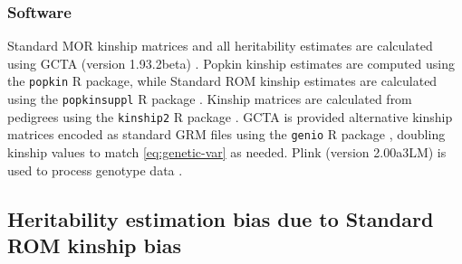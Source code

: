 \documentclass[11pt]{article}
\begin{document}
\subsubsection{Software}

Standard MOR kinship matrices and all heritability estimates are calculated using GCTA (version 1.93.2beta) \citep{yang_gcta:_2011}.
Popkin kinship estimates are computed using the \texttt{popkin} R package, while Standard ROM kinship estimates are calculated using the \texttt{popkinsuppl} R package \citep{ochoa_estimating_2021}. 
Kinship matrices are calculated from pedigrees using the \texttt{kinship2} R package \citep{sinnwell_kinship2_2014}. 
GCTA is provided alternative kinship matrices encoded as standard GRM files using the \texttt{genio} R package \citep{yao_limitations_2022}, doubling kinship values to match \cref{eq:genetic-var} as needed.
Plink (version 2.00a3LM) is used to process genotype data \citep{chang_second-generation_2015}.

\subsection{Heritability estimation bias due to Standard ROM kinship bias}
\end{document}

